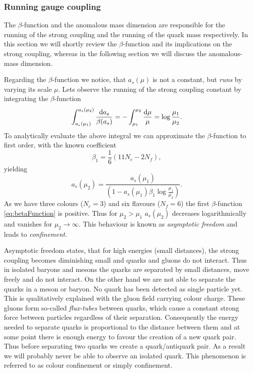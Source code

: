 \documentclass[../../index.tex]{subfiles}
\begin{document}
\subsubsection{Running gauge coupling}
The $\beta$-function and the anomalous mass dimension are responsible for the
running of the strong coupling and the running of the quark mass respectively.
In this section we will shortly review the $\beta$-function and its implications
on the strong coupling, whereas in the following section we will discuss the
anomalous-mass dimension.

Regarding the $\beta$-function we notice, that $a_s(\mu)$ is not a constant, but
\textit{runs} by varying its scale $\mu$. Lets observe the running of the strong
coupling constant by integrating the $\beta$-function
\begin{equation}
  \int_{a_s(\mu_1)}^{a_s(\mu_2)}\frac{\dif a_s}{\beta(a_s)} = - \int_{\mu_1}^{\mu_2} \frac{\dif \mu}{\mu} = \log \frac{\mu_1}{\mu_2}.
\end{equation}
To analytically evaluate the above integral we can approximate the
$\beta$-function to first order, with the known coefficient
\begin{equation}
  \label{eq:firstBetaCoefficient}
  \beta_1 = \frac{1}{6}(11 N_c - 2 N_f),
\end{equation}
yielding
\begin{equation}
  a_s(\mu_2) = \frac{a_s(\mu_1)}{\left( 1 - a_s(\mu_1) \beta_1 \log\frac{\mu_1}{\mu_2} \right)}.
\end{equation}
As we have three colours ($N_c=3$) and six flavours ($N_f=6$) the first
$\beta$-function \ref{eq:betaFunction} is positive. Thus for $\mu_2>\mu_1$
$a_s(\mu_2)$ decreases logarithmically and vanishes for $\mu_2 \to \infty$. This
behaviour is known as \textit{asymptotic freedom} and leads to
\textit{confinement}.

Asymptotic freedom states, that for high energies (small distances), the strong
coupling becomes diminishing small and quarks and gluons do not interact. Thus
in isolated baryons and mesons the quarks are separated by small distances, move
freely and do not interact. On the other hand we are not able to separate the
quarks in a meson or baryon. No quark has been detected as single particle yet.
This is qualitatively explained with the gluon field carrying colour charge.
These gluons form so-called \textit{flux-tubes} between quarks, which cause a
constant strong force between particles regardless of their separation.
Consequently the energy needed to separate quarks is proportional to the
distance between them and at some point there is enough energy to favour the
creation of a new quark pair. Thus before separating two quarks we create a
quark\-/antiquark pair. As a result we will probably never be able to observe an
isolated quark. This phenomenon is referred to as colour confinement or simply
confinement.
\end{document}
